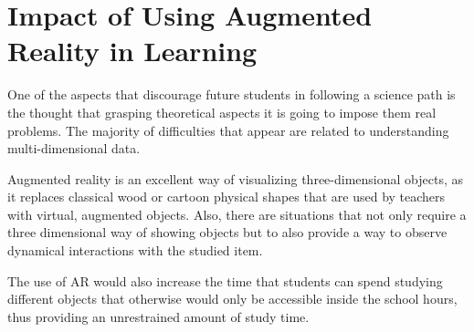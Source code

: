 \documentclass[12 pct]{report}
\begin{document}
\section{Impact of Using Augmented Reality in Learning}
One of the aspects that discourage future students in following a science path is the thought that grasping theoretical aspects it is going to impose them real problems. The majority of difficulties that appear are related to understanding multi-dimensional data.

Augmented reality is an excellent way of visualizing three-dimensional objects, as it replaces classical wood or cartoon physical shapes that are used by teachers with virtual, augmented objects. Also, there are situations that not only require a three dimensional way of showing objects but to also provide a way to observe dynamical interactions with the studied item.

The use of AR would also increase the time that students can spend studying different objects that otherwise would only be accessible inside the school hours, thus providing an unrestrained amount of study time.
\end{document}
